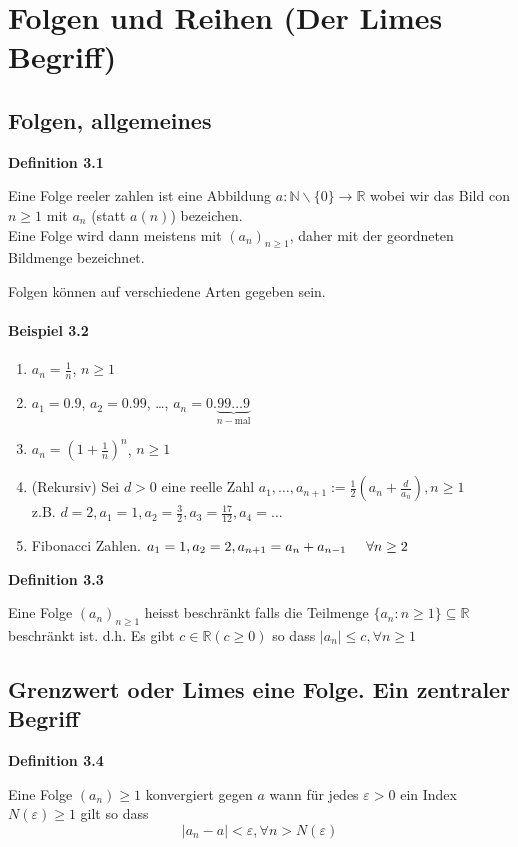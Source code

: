 \chapter{Folgen und Reihen (Der Limes Begriff)}
\section{Folgen, allgemeines}
\begin{framed}
\centerline{\textbf{Definition 3.1}}
\noindent Eine Folge reeler zahlen ist eine Abbildung $a:\mathbb{N}\backslash\{0\}\rightarrow\mathbb{R}$ wobei wir das Bild con $n\geq 1$ mit $a_n$ (statt $a(n)$) bezeichen.\\

Eine Folge wird dann meistens mit $(a_n)_{n\geq 1}$, daher mit der geordneten Bildmenge bezeichnet.
\end{framed}

\noindent  Folgen können auf verschiedene Arten gegeben sein.
\subsubsection*{Beispiel 3.2}
\begin{enumerate}
\item $a_n=\frac{1}{n}$, $n\geq 1$
\item $a_1=0.9$, $a_2=0.99$, \dots, ${a_n} = 0.\underbrace {99 \ldots 9}_{n-\text{mal}}$
\item $a_n=\left( 1+\frac{1}{n}\right)^n$, $n\geq 1$
\item (Rekursiv) Sei $d>0$ eine reelle Zahl $a_1,\dots, a_{n+1}:=\frac{1}{2}\left( a_n + \frac{d}{a_n}\right), n\geq 1$\\
z.B. $d=2,a_1=1,a_2=\frac{3}{2},a_3=\frac{17}{12},a_4=\dots$
\item Fibonacci Zahlen. $a_1=1,a_2=2, a_{n+1}=a_n+a_{n-1}\hspace{5mm}\forall n\geq 2$
\end{enumerate}

\begin{framed}
\centerline{\textbf{Definition 3.3}}
\noindent Eine Folge $(a_n)_{n\geq 1}$ heisst beschränkt falls die Teilmenge $\{a_n:n\geq 1\}\subseteq\mathbb{R}$ beschränkt ist. d.h. Es gibt $c\in\mathbb{R} (c\geq 0)$ so dass $\left| a_n\right| \leq c, \forall n\geq 1$ 
\end{framed}

\section{Grenzwert oder Limes eine Folge. Ein zentraler Begriff}
\begin{framed}
\centerline{\textbf{Definition 3.4}}
\noindent Eine Folge $(a_n)\geq 1$ konvergiert gegen $a$ wann für jedes $\varepsilon>0$ ein Index $N(\varepsilon)\geq 1$ gilt so dass $$  \left| a_n-a\right| <\varepsilon, \forall n>N(\varepsilon)$$ 
\end{framed}

